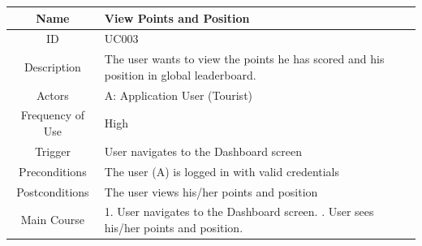 \documentclass[12pt, a4paper, oneside]{article}
\begin{document}
\begin{table}[H]
\begin{tabularx}{\linewidth}{|c|X|}
\hline
Name                & View Points and Position                                                                                                                                                                                                                      \\ \hline
ID                  & UC003                                                                                                                                                                                                                       \\ \hline
Description         & The user wants to view the points he has scored and his position in global leaderboard.                                                                                                                                                    \\ \hline
Actors              & A: Application User (Tourist)                                                                                                                                                                                                  \\ \hline
Frequency of Use    & High                                                                                                                                                                                                                    \\ \hline
Trigger             & User navigates to the Dashboard screen                                                                                                                                                                                           \\ \hline
Preconditions       & The user (A) is logged in with valid credentials                                                                                                                                                                                                                           \\ \hline
Postconditions      & The user views his/her points and position                                                                                                                                        \\ \hline
Main Course         & 1. User navigates to the Dashboard screen. \newline 2. User sees his/her points and position. \\ \hline

\end{tabularx}
\end{table}
\end{document}
